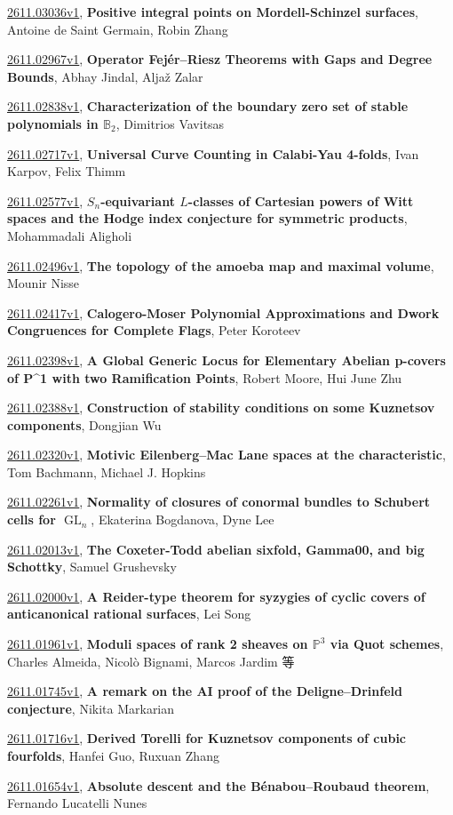 \documentclass[9pt, a4paper]{article}
\theoremstyle{plain}
\theoremstyle{definition}
\theoremstyle{remark}
\newcommand{\arxiv}[3]{\href{https://arxiv.org/abs/#1}{#1}, \textbf{\textcolor{arxivblue}{#2}}, #3}
\begin{document}
\arxiv{2611.03036v1}{Positive integral points on Mordell-Schinzel surfaces}{Antoine de Saint Germain, Robin Zhang}

\arxiv{2611.02967v1}{Operator Fejér--Riesz Theorems with Gaps and Degree Bounds}{Abhay Jindal, Aljaž Zalar}

\arxiv{2611.02838v1}{Characterization of the boundary zero set of stable polynomials in $\mathbb B_2$}{Dimitrios Vavitsas}

\arxiv{2611.02717v1}{Universal Curve Counting in Calabi-Yau 4-folds}{Ivan Karpov, Felix Thimm}

\arxiv{2611.02577v1}{$S_n$-equivariant $L$-classes of Cartesian powers of Witt spaces and the Hodge index conjecture for symmetric products}{Mohammadali Aligholi}

\arxiv{2611.02496v1}{The topology of the amoeba map and maximal volume}{Mounir Nisse}

\arxiv{2611.02417v1}{Calogero-Moser Polynomial Approximations and Dwork Congruences for Complete Flags}{Peter Koroteev}

\arxiv{2611.02398v1}{A Global Generic Locus for Elementary Abelian p-covers of P^1 with two Ramification Points}{Robert Moore, Hui June Zhu}

\arxiv{2611.02388v1}{Construction of stability conditions on some Kuznetsov components}{Dongjian Wu}

\arxiv{2611.02320v1}{Motivic Eilenberg--Mac Lane spaces at the characteristic}{Tom Bachmann, Michael J. Hopkins}

\arxiv{2611.02261v1}{Normality of closures of conormal bundles to Schubert cells for $\operatorname{GL}_n$}{Ekaterina Bogdanova, Dyne Lee}

\arxiv{2611.02013v1}{The Coxeter-Todd abelian sixfold, Gamma00, and big Schottky}{Samuel Grushevsky}

\arxiv{2611.02000v1}{A Reider-type theorem for syzygies of cyclic covers of anticanonical rational surfaces}{Lei Song}

\arxiv{2611.01961v1}{Moduli spaces of rank 2 sheaves on $\mathbb P^3$ via Quot schemes}{Charles Almeida, Nicolò Bignami, Marcos Jardim 等}

\arxiv{2611.01745v1}{A remark on the AI proof of the Deligne--Drinfeld conjecture}{Nikita Markarian}

\arxiv{2611.01716v1}{Derived Torelli for Kuznetsov components of cubic fourfolds}{Hanfei Guo, Ruxuan Zhang}

\arxiv{2611.01654v1}{Absolute descent and the Bénabou--Roubaud theorem}{Fernando Lucatelli Nunes}
\end{document}
